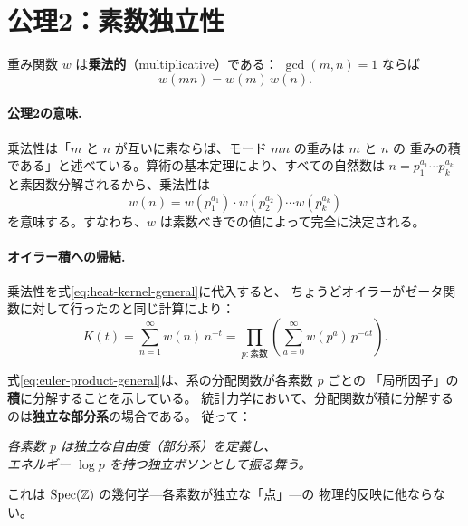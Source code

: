 \section{公理2：素数独立性}
\label{sec:axiom2}

\begin{dfnbox}[公理2（素数独立性）]
重み関数 $w$ は\textbf{乗法的}（multiplicative）である：
$\gcd(m, n) = 1$ ならば
\begin{equation}
  w(mn) = w(m)\, w(n).
  \label{eq:multiplicativity}
\end{equation}
\end{dfnbox}

\paragraph{公理2の意味.}
乗法性は「$m$ と $n$ が互いに素ならば、モード $mn$ の重みは $m$ と $n$ の
重みの積である」と述べている。算術の基本定理により、すべての自然数は
$n = p_1^{a_1} \cdots p_k^{a_k}$ と素因数分解されるから、乗法性は
\begin{equation}
  w(n) = w(p_1^{a_1}) \cdot w(p_2^{a_2}) \cdots w(p_k^{a_k})
\end{equation}
を意味する。すなわち、$w$ は素数べきでの値によって完全に決定される。

\paragraph{オイラー積への帰結.}
乗法性を式\eqref{eq:heat-kernel-general}に代入すると、
ちょうどオイラーがゼータ関数に対して行ったのと同じ計算により：
\begin{equation}
  K(t) = \sum_{n=1}^{\infty} w(n)\, n^{-t}
       = \prod_{p:\text{素数}} \left( \sum_{a=0}^{\infty} w(p^a)\, p^{-at} \right).
  \label{eq:euler-product-general}
\end{equation}

\begin{keyresult}[公理2の物理的意味]
式\eqref{eq:euler-product-general}は、系の分配関数が各素数 $p$ ごとの
「局所因子」の\textbf{積}に分解することを示している。
統計力学において、分配関数が積に分解するのは\textbf{独立な部分系}の場合である。
従って：

\begin{center}
\emph{各素数 $p$ は独立な自由度（部分系）を定義し、\\
エネルギー $\log p$ を持つ独立ボソンとして振る舞う。}
\end{center}

これは $\operatorname{Spec}(\mathbb{Z})$ の幾何学---各素数が独立な「点」---の
物理的反映に他ならない。
\end{keyresult}

